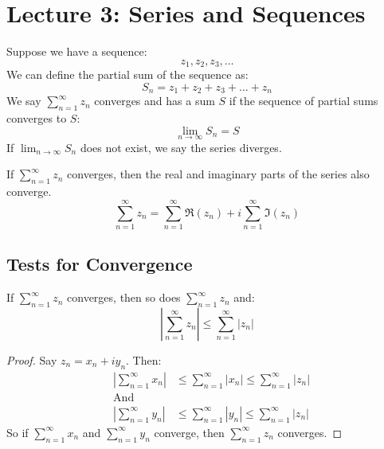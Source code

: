 \chapter{Lecture 3: Series and Sequences}

\begin{definition}
    Suppose we have a sequence:
    \begin{equation}
        z_1, z_2, z_3, \ldots
    \end{equation}
    We can define the partial sum of the sequence as:
    \begin{equation}
        S_n = z_1 + z_2 + z_3 + \ldots + z_n
    \end{equation}
    We say $\sum_{n=1}^{\infty} z_n$ converges and has a sum $S$ if the sequence of partial sums converges to $S$:
    \begin{equation}
        \lim_{n \to \infty} S_n = S
    \end{equation}
    If $\lim_{n \to \infty} S_n$ does not exist, we say the series diverges.
\end{definition}

\begin{corollary}
    If $\sum_{n=1}^{\infty} z_n$ converges, then the real and imaginary parts of the series also converge.
    \begin{equation}
        \sum_{n=1}^{\infty} z_n = \sum_{n=1}^{\infty} \Re(z_n) + i \sum_{n=1}^{\infty} \Im(z_n)
    \end{equation}
\end{corollary}

\section{Tests for Convergence}
\begin{theorem}
    If $\sum_{n=1}^{\infty} z_n$ converges, then so does $\sum_{n=1}^{\infty} z_n$ and:
    \[
        \left| \sum_{n=1}^{\infty} z_n \right| \leq \sum_{n=1}^{\infty} |z_n|
    \]
\end{theorem}

\begin{proof}
    Say $z_n = x_n + i y_n$. Then:
    \begin{align}
         & \left| \sum_{n=1}^{\infty} x_n \right| & \leq \sum_{n=1}^{\infty}  \left| x_n \right| \leq \sum_{n=1}^{\infty}  \left| z_n \right| \\
         & \text{And}                                                                                                                         \\
         & \left| \sum_{n=1}^{\infty} y_n \right| & \leq \sum_{n=1}^{\infty}  \left| y_n \right| \leq \sum_{n=1}^{\infty}  \left| z_n \right|
    \end{align}
    So if $\sum_{n=1}^{\infty} x_n$ and $\sum_{n=1}^{\infty} y_n$ converge, then $\sum_{n=1}^{\infty} z_n$ converges.
\end{proof}

